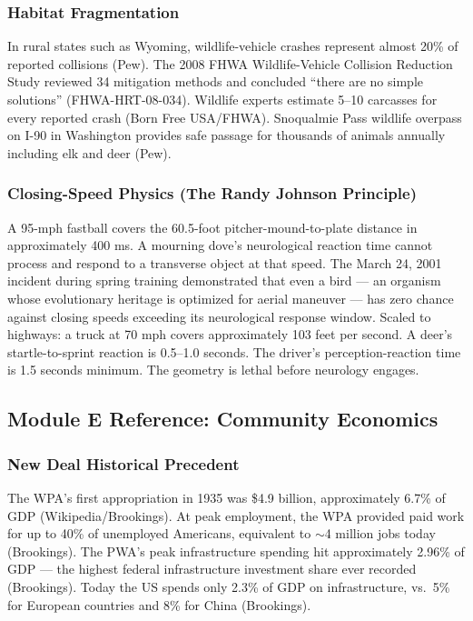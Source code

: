 \documentclass[11pt,letterpaper]{article}
\begin{document}
\subsubsection{Habitat Fragmentation}
In rural states such as Wyoming, wildlife-vehicle crashes represent almost 20\% of reported collisions (Pew). The 2008 FHWA Wildlife-Vehicle Collision Reduction Study reviewed 34 mitigation methods and concluded ``there are no simple solutions'' (FHWA-HRT-08-034). Wildlife experts estimate 5--10 carcasses for every reported crash (Born Free USA/FHWA). Snoqualmie Pass wildlife overpass on I-90 in Washington provides safe passage for thousands of animals annually including elk and deer (Pew).

\subsubsection{Closing-Speed Physics (The Randy Johnson Principle)}
A 95-mph fastball covers the 60.5-foot pitcher-mound-to-plate distance in approximately 400 ms. A mourning dove's neurological reaction time cannot process and respond to a transverse object at that speed. The March 24, 2001 incident during spring training demonstrated that even a bird --- an organism whose evolutionary heritage is optimized for aerial maneuver --- has zero chance against closing speeds exceeding its neurological response window. Scaled to highways: a truck at 70 mph covers approximately 103 feet per second. A deer's startle-to-sprint reaction is 0.5--1.0 seconds. The driver's perception-reaction time is 1.5 seconds minimum. The geometry is lethal before neurology engages.

\subsection{Module E Reference: Community Economics}

\subsubsection{New Deal Historical Precedent}
The WPA's first appropriation in 1935 was \$4.9 billion, approximately 6.7\% of GDP (Wikipedia/Brookings). At peak employment, the WPA provided paid work for up to 40\% of unemployed Americans, equivalent to $\sim$4 million jobs today (Brookings). The PWA's peak infrastructure spending hit approximately 2.96\% of GDP --- the highest federal infrastructure investment share ever recorded (Brookings). Today the US spends only 2.3\% of GDP on infrastructure, vs.\ 5\% for European countries and 8\% for China (Brookings).
\end{document}
